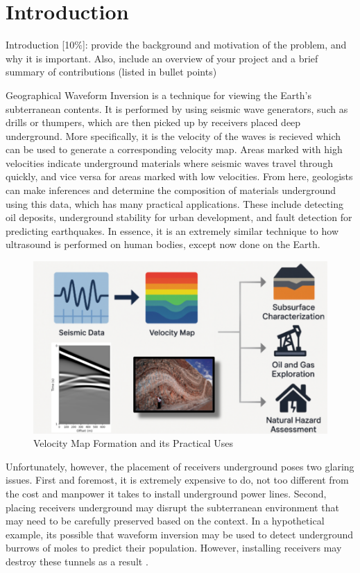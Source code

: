 \documentclass{article}
\newcommand{\instructions}[1]{{\color{blue} #1}}
\begin{document}


\section{Introduction}
\instructions{Introduction [10\%]: provide the background and motivation of the problem, and why it is important. Also, include an overview of your project and a brief summary of contributions (listed in bullet points)} 

    Geographical Waveform Inversion is a technique for viewing the Earth's subterranean contents. It is performed by using seismic wave generators, such as drills or thumpers, which are then picked up by receivers placed deep underground. More specifically, it is the velocity of the waves is recieved which can be used to generate a corresponding velocity map. Areas marked with high velocities indicate underground materials where seismic waves travel through quickly, and vice versa for areas marked with low velocities. From here, geologists can make inferences and determine the composition of materials underground using this data, which has many practical applications. These include detecting oil deposits, underground stability for urban development, and fault detection for predicting earthquakes. In essence, it is an extremely similar technique to how ultrasound is performed on human bodies, except now done on the Earth.  

    \begin{figure}[H]
        \centering
        \includegraphics[width=0.5\linewidth]{figures/intro2.png}
        \caption{Velocity Map Formation and its Practical Uses }
        \label{fig:intro2}
    \end{figure}
    
    Unfortunately, however, the placement of receivers underground poses two glaring issues. First and foremost, it is extremely expensive to do, not too different from the cost and manpower it takes to install underground power lines. Second, placing receivers underground may disrupt the subterranean environment that may need to be carefully preserved based on the context. In a hypothetical example, its possible that waveform inversion may be used to detect underground burrows of moles to predict their population. However, installing receivers may destroy these tunnels as a result \cite{ctbto_waveform}.  
\end{document}
